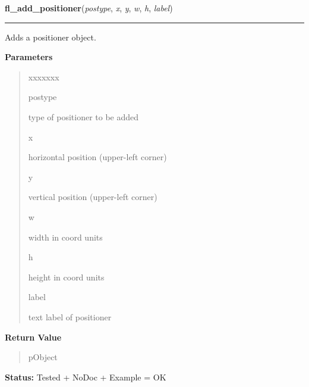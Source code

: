 \hspace{.8\funcindent}\begin{boxedminipage}{\funcwidth}

    \raggedright \textbf{fl\_add\_positioner}(\textit{postype}, \textit{x}, \textit{y}, \textit{w}, \textit{h}, \textit{label})

    \vspace{-1.5ex}

    \rule{\textwidth}{0.5\fboxrule}
\setlength{\parskip}{2ex}
    Adds a positioner object.

\setlength{\parskip}{1ex}
      \textbf{Parameters}
      \vspace{-1ex}

      \begin{quote}
        \begin{Ventry}{xxxxxxx}

          \item[postype]

          type of positioner to be added

          \item[x]

          horizontal position (upper-left corner)

          \item[y]

          vertical position (upper-left corner)

          \item[w]

          width in coord units

          \item[h]

          height in coord units

          \item[label]

          text label of positioner

        \end{Ventry}

      \end{quote}

      \textbf{Return Value}
    \vspace{-1ex}

      \begin{quote}
      pObject

      \end{quote}

\textbf{Status:} Tested + NoDoc + Example = OK



    \end{boxedminipage}

